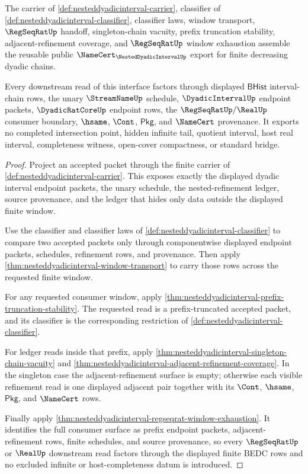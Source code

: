 \begin{theorem}
\label{thm:nesteddyadicinterval-public-namecert-export}
The carrier of \autoref{def:nesteddyadicinterval-carrier}, classifier of
\autoref{def:nesteddyadicinterval-classifier}, classifier laws, window
transport, $\RegSeqRatUp$ handoff, singleton-chain vacuity, prefix
truncation stability, adjacent-refinement coverage, and $\RegSeqRatUp$
window exhaustion assemble the reusable public
$\NameCert_{\NestedDyadicIntervalUp}$ export for finite decreasing dyadic
chains.

Every downstream read of this interface factors through displayed
$\mathsf{BHist}$ interval-chain rows, the unary $\StreamNameUp$ schedule,
$\DyadicIntervalUp$ endpoint packets, $\DyadicRatCoreUp$ endpoint rows, the
$\RegSeqRatUp/\RealUp$ consumer boundary, $\hsame$, $\Cont$, $\mathsf{Pkg}$,
and $\NameCert$ provenance. It exports no completed intersection point,
hidden infinite tail, quotient interval, host real interval, completeness
witness, open-cover compactness, or standard bridge.
\end{theorem}
\begin{proof}
Project an accepted packet through the finite carrier of
\autoref{def:nesteddyadicinterval-carrier}. This exposes exactly the
displayed dyadic interval endpoint packets, the unary schedule, the
nested-refinement ledger, source provenance, and the ledger that hides only
data outside the displayed finite window.

Use the classifier and classifier laws of
\autoref{def:nesteddyadicinterval-classifier} to compare two accepted packets
only through componentwise displayed endpoint packets, schedules, refinement
rows, and provenance. Then apply
\autoref{thm:nesteddyadicinterval-window-transport} to carry those rows across
the requested finite window.

For any requested consumer window, apply
\autoref{thm:nesteddyadicinterval-prefix-truncation-stability}. The requested
read is a prefix-truncated accepted packet, and its classifier is the
corresponding restriction of \autoref{def:nesteddyadicinterval-classifier}.

For ledger reads inside that prefix, apply
\autoref{thm:nesteddyadicinterval-singleton-chain-vacuity} and
\autoref{thm:nesteddyadicinterval-adjacent-refinement-coverage}. In the
singleton case the adjacent-refinement surface is empty; otherwise each
visible refinement read is one displayed adjacent pair together with its
$\Cont$, $\hsame$, $\mathsf{Pkg}$, and $\NameCert$ rows.

Finally apply \autoref{thm:nesteddyadicinterval-regseqrat-window-exhaustion}. It identifies the full consumer surface as prefix endpoint packets, adjacent-refinement rows, finite schedules, and source provenance, so every $\RegSeqRatUp$ or $\RealUp$ downstream read factors through the displayed finite BEDC rows and no excluded infinite or host-completeness datum is introduced.
\end{proof}

